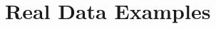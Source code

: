 \documentclass[12pt]{article}
\begin{document}





\section{Real Data Examples}
\label{sec:realdata}
\end{document}
